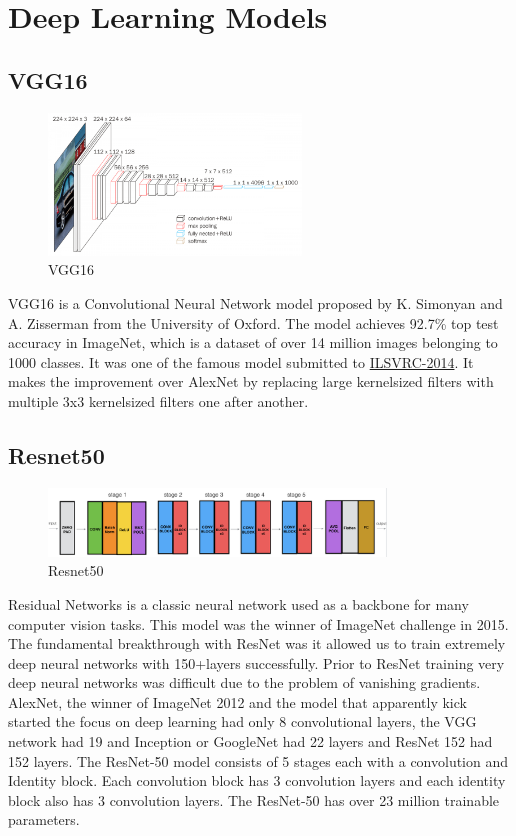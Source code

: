 \documentclass[11pt]{article}
\begin{document}
	\section{Deep Learning Models}
	\subsection{VGG16 \cite{simonyan2014very}}
	\begin{figure}[ht]
		\centering
		\includegraphics[width=0.6\textwidth]{vgg16_arch}
		\caption{VGG16}
	\end{figure}
    VGG16 is a Convolutional Neural Network model proposed by K. Simonyan and A. Zisserman from the University of Oxford. The model achieves 92.7\% top test accuracy in ImageNet, which is a dataset of over 14 million images belonging to 1000 classes. It was one of the famous model submitted to \href{http://www.image-net.org/challenges/LSVRC/2014/results}{ILSVRC-2014}. It makes the improvement over AlexNet by replacing large kernel\-sized filters with multiple 3x3 kernel\-sized filters one after another.
    
    \subsection{Resnet50 \cite{he2016deep}}
    \begin{figure}[ht]
    	\centering
    	\includegraphics[width=0.8\textwidth]{resnet50_arch}
    	\caption{Resnet50}
    \end{figure}
    Residual Networks is a classic neural network used as a backbone for many computer vision tasks. This model was the winner of ImageNet challenge in 2015. The fundamental breakthrough with ResNet was it allowed us to train extremely deep neural networks with 150+layers successfully. Prior to ResNet training very deep neural networks was difficult due to the problem of vanishing gradients.
    AlexNet, the winner of ImageNet 2012 and the model that apparently kick started the focus on deep learning had only 8 convolutional layers, the VGG network had 19 and Inception or GoogleNet had 22 layers and ResNet 152 had 152 layers.
    \newline
    \newline 
    The ResNet-50 model consists of 5 stages each with a convolution and Identity block. Each convolution block has 3 convolution layers and each identity block also has 3 convolution layers. The ResNet-50 has over 23 million trainable parameters.
    
\end{document}
